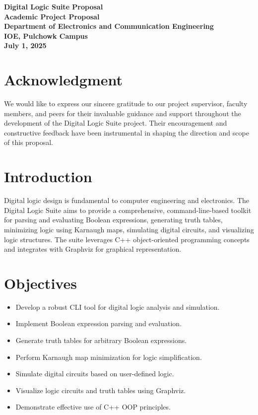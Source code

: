 \documentclass[a4paper,12pt]{article}
\begin{document}
\begin{center}
    \vspace*{2cm}
    {\LARGE \textbf{Digital Logic Suite Proposal}}\\[2cm]
    \textbf{Academic Project Proposal}\\[1cm]
    \vfill
    \textbf{Department of Electronics and Communication Engineering}\\
    \textbf{IOE, Pulchowk Campus}\\
    \textbf{July 1, 2025}\\
    \vspace*{2cm}
\end{center}
\thispagestyle{empty}
\newpage

\section*{Acknowledgment}
We would like to express our sincere gratitude to our project supervisor, faculty members, and peers for their invaluable guidance and support throughout the development of the Digital Logic Suite project. Their encouragement and constructive feedback have been instrumental in shaping the direction and scope of this proposal.

\newpage

\tableofcontents
\newpage

\section{Introduction}
Digital logic design is fundamental to computer engineering and electronics. The Digital Logic Suite aims to provide a comprehensive, command-line-based toolkit for parsing and evaluating Boolean expressions, generating truth tables, minimizing logic using Karnaugh maps, simulating digital circuits, and visualizing logic structures. The suite leverages C++ object-oriented programming concepts and integrates with Graphviz for graphical representation.

\section{Objectives}
\begin{itemize}
    \item Develop a robust CLI tool for digital logic analysis and simulation.
    \item Implement Boolean expression parsing and evaluation.
    \item Generate truth tables for arbitrary Boolean expressions.
    \item Perform Karnaugh map minimization for logic simplification.
    \item Simulate digital circuits based on user-defined logic.
    \item Visualize logic circuits and truth tables using Graphviz.
    \item Demonstrate effective use of C++ OOP principles.
\end{itemize}
\end{document}
